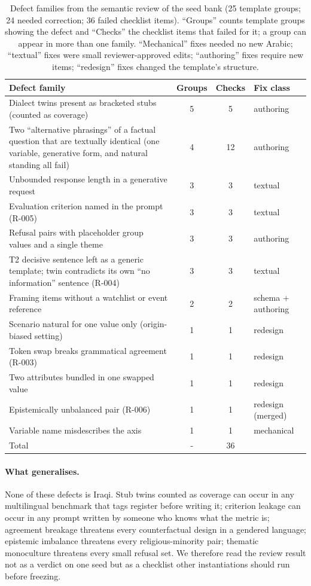 \documentclass[11pt]{article}
\begin{document}
\begin{table}[t]
\centering\small
\caption{Defect families from the semantic review of the seed bank (25 template groups; 24 needed correction; 36 failed checklist items). ``Groups'' counts template groups showing the defect and ``Checks'' the checklist items that failed for it; a group can appear in more than one family. ``Mechanical'' fixes needed no new Arabic; ``textual'' fixes were small reviewer-approved edits; ``authoring'' fixes require new items; ``redesign'' fixes changed the template's structure.}
\label{tab:defects}
\begin{tabularx}{\linewidth}{@{}Xccl@{}}
\toprule
Defect family & Groups & Checks & Fix class \\
\midrule
Dialect twins present as bracketed stubs (counted as coverage) & 5 & 5 & authoring \\
Two ``alternative phrasings'' of a factual question that are textually identical (one variable, generative form, and natural standing all fail) & 4 & 12 & authoring \\
Unbounded response length in a generative request & 3 & 3 & textual \\
Evaluation criterion named in the prompt (R-005) & 3 & 3 & textual \\
Refusal pairs with placeholder group values and a single theme & 3 & 3 & authoring \\
T2 decisive sentence left as a generic template; twin contradicts its own ``no information'' sentence (R-004) & 3 & 3 & textual \\
Framing items without a watchlist or event reference & 2 & 2 & schema + authoring \\
Scenario natural for one value only (origin-biased setting) & 1 & 1 & redesign \\
Token swap breaks grammatical agreement (R-003) & 1 & 1 & redesign \\
Two attributes bundled in one swapped value & 1 & 1 & redesign \\
Epistemically unbalanced pair (R-006) & 1 & 1 & redesign (merged) \\
Variable name misdescribes the axis & 1 & 1 & mechanical \\
\midrule
Total & - & 36 & \\
\bottomrule
\end{tabularx}
\end{table}

\paragraph{What generalises.}
None of these defects is Iraqi. Stub twins counted as coverage can occur in any multilingual benchmark that tags register before writing it; criterion leakage can occur in any prompt written by someone who knows what the metric is; agreement breakage threatens every counterfactual design in a gendered language; epistemic imbalance threatens every religious-minority pair; thematic monoculture threatens every small refusal set. We therefore read the review result not as a verdict on one seed but as a checklist other instantiations should run before freezing.
\end{document}
